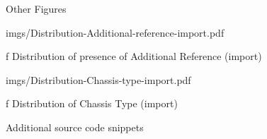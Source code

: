 \app Other Figures

\medskip
{}
\picw=15cm \cinspic imgs/Distribution-Additional-reference-import.pdf
\caption/f Distribution of presence of Additional Reference (import)
\medskip

\medskip
{}
\picw=15cm \cinspic imgs/Distribution-Chassis-type-import.pdf
\caption/f Distribution of Chassis Type (import)
\medskip

\app Additional source code snippets